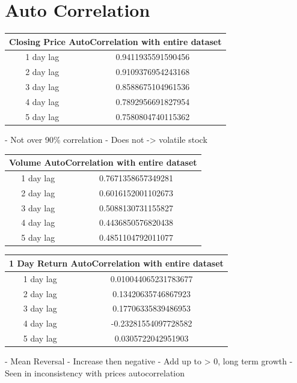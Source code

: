 \section{Auto Correlation}

\begin{center}
\begin{tabular}{ c c }
\hline
\multicolumn{2}{|c|}{Closing Price AutoCorrelation with entire dataset} \\
\hline
1 day lag & 0.9411935591590456 \\
2 day lag & 0.9109376954243168 \\
3 day lag & 0.8588675104961536 \\
4 day lag & 0.7892956691827954 \\
5 day lag & 0.7580804740115362
\end{tabular}
\end{center}

- Not over 90\% correlation
- Does not -> volatile stock

\begin{center}
\begin{tabular}{ c c }
\hline
\multicolumn{2}{|c|}{Volume AutoCorrelation with entire dataset} \\
\hline
1 day lag & 0.7671358657349281 \\
2 day lag & 0.6016152001102673 \\
3 day lag & 0.5088130731155827 \\
4 day lag & 0.4436850576820438 \\
5 day lag & 0.4851104792011077
\end{tabular}
\end{center}

\begin{center}
\begin{tabular}{ c c }
\hline
\multicolumn{2}{|c|}{1 Day Return AutoCorrelation with entire dataset} \\
\hline
1 day lag & 0.010044065231783677 \\
2 day lag & 0.13420635746867923 \\
3 day lag & 0.17706335839486953 \\
4 day lag & -0.23281554097728582 \\
5 day lag & 0.0305722042951903
\end{tabular}
\end{center}

- Mean Reversal
    - Increase then negative
- Add up to > 0, long term growth
    - Seen in inconsistency with prices autocorrelation

